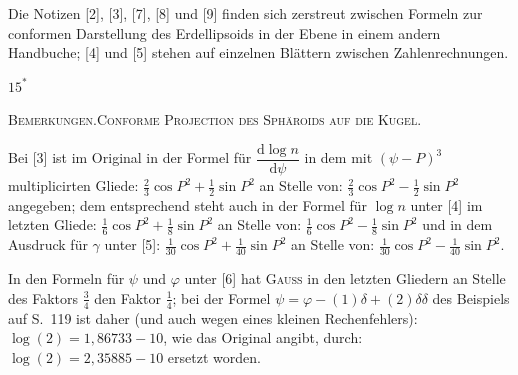 Die Notizen [2], [3], [7], [8] und [9] finden sich zerstreut zwischen Formeln zur conformen Darstellung des Erdellipsoids in der Ebene in einem andern Handbuche; [4] und [5] stehen auf einzelnen Blättern zwischen Zahlenrechnungen.
\par\endgroup
\vfill\hfill$15^*$\hspace*{2cm}\par
\clearpage
{}\hfill{\footnotesize\textsc{Bemerkungen.\quad Conforme Projection des Sphäroids auf die Kugel.}}\par\medskip
\begingroup\small
Bei [3] ist im Original in der Formel für $\dfrac{\mathrm d\log n}{\mathrm d\psi}$ in dem mit $(\psi-P)^3$ multiplicirten Gliede: $\tfrac23\cos P^2+\tfrac12\sin P^2$ an Stelle von: $\tfrac23\cos P^2-\tfrac12\sin P^2$ angegeben; dem entsprechend steht auch in der Formel für $\log n$ unter [4] im letzten Gliede: $\tfrac16\cos P^2+\tfrac18\sin P^2$ an Stelle von: $\tfrac16\cos P^2-\tfrac18\sin P^2$ und in dem Ausdruck für $\gamma$ unter [5]: $\tfrac1{30}\cos P^2+\tfrac1{40}\sin P^2$ an Stelle von: $\tfrac1{30}\cos P^2-\tfrac1{40}\sin P^2$.

In den Formeln für $\psi$ und $\varphi$ unter [6] hat \textsc{Gauss} in den letzten Gliedern an Stelle des Faktors $\tfrac34$ den Faktor $\tfrac14$; bei der Formel $\psi=\varphi-(1)\delta+(2)\delta\delta$ des Beispiels auf S.~119 ist daher (und auch wegen eines kleinen Rechenfehlers): $\log(2)=1{,}86733-10$, wie das Original angibt, durch: $\log(2)=2{,}35885-10$ ersetzt worden.

